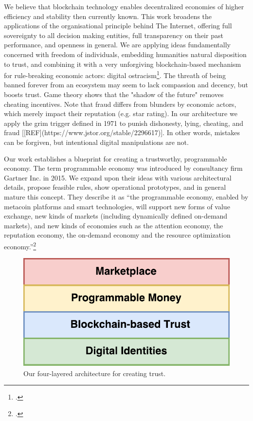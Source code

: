 \documentclass[USenglish]{article}
\begin{document}
We believe that blockchain technology enables decentralized economies of higher efficiency and stability then currently known. 
This work broadens the applications of the organisational principle behind The Internet, offering full sovereignty to all decision making entities, full transparency on their past performance, and openness in general.
We are applying ideas fundamentally concerned with freedom of individuals, embedding humanities natural disposition to trust, and combining it with a very unforgiving blockchain-based mechanism for rule-breaking economic actors: digital ostracism\footcite{bicchieri2004trust}. 
The threath of being banned forever from an ecosystem may seem to lack compassion and decency, but boosts trust. 
Game theory shows that the "shadow of the future" removes cheating incentives.
Note that fraud differs from blunders by economic actors, which merely impact their reputation (e.g. star rating).
In our architecture we apply the grim trigger defined in 1971 to punish dishonesty, lying, cheating, and fraud [[REF](https://www.jstor.org/stable/2296617)].
In other words, mistakes can be forgiven, but intentional digital manipulations are not.

Our work establishes a blueprint for creating a trustworthy, programmable economy.
The term programmable economy was introduced by consultancy firm Gartner Inc. in 2015. 
We expand upon their ideas with various architectural details, propose feasible rules, show operational prototypes, and in general mature this concept.
They describe it as ``the programmable economy, enabled by metacoin platforms and smart technologies, will support new forms of value exchange, new kinds of markets (including dynamically defined on-demand markets), and new kinds of economies such as the attention economy, the reputation economy, the on-demand economy and the resource optimization economy.''\footcite{gartnerprogrammableeconomy}

\begin{figure}[t]
	\centering
	\includegraphics[width=1\columnwidth]{assets/tech_stack_simple}
	\caption{Our four-layered architecture for creating trust.}
	\label{fig:tech_stack_simple}
\end{figure}
\end{document}
